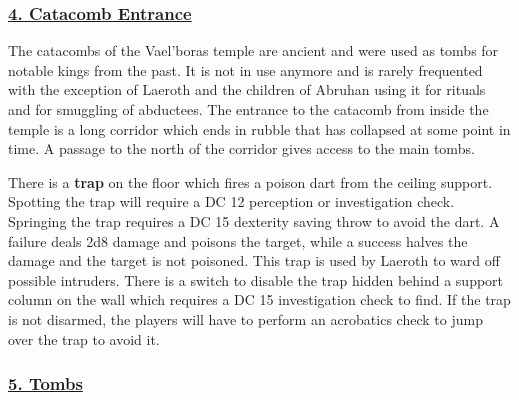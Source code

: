 \begin{multicols*}{2}
\subsubsection*{\underline{4. Catacomb Entrance}}
The catacombs of the Vael'boras temple are ancient and were used  as tombs for notable kings from the past. It is not in use anymore and is rarely frequented with the exception of Laeroth and the children of Abruhan using it for rituals and for smuggling of abductees. The entrance to the catacomb from inside the temple is a long corridor which ends in rubble that has collapsed at some point in time. A passage to the north of the corridor gives access to the main tombs. 

There is a \textbf{trap} on the floor which fires a poison dart from the ceiling support. Spotting the trap will require a DC 12 perception or investigation check. Springing the trap requires a DC 15 dexterity saving throw to avoid the dart. A failure deals 2d8 damage and poisons the target, while a success halves the damage and the target is not poisoned. This trap is used by Laeroth to ward off possible intruders. There is a switch to disable the trap hidden behind a support column on the wall which requires a DC 15 investigation check to find. If the trap is not disarmed, the players will have to perform an acrobatics check to jump over the trap to avoid it.

\subsubsection*{\underline{5. Tombs}}

\end{multicols*}


\pagebreak
